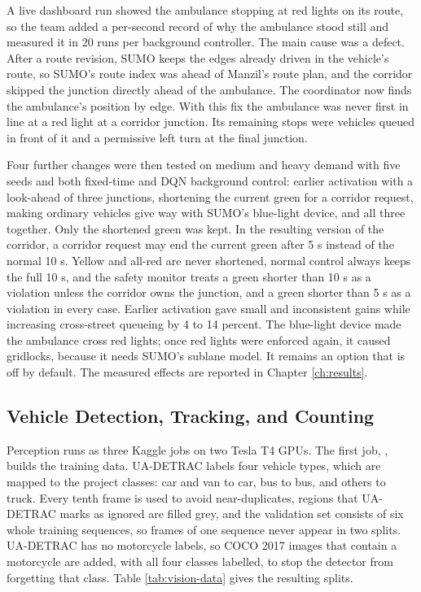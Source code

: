 A live dashboard run showed the ambulance stopping at red lights on its route, so the team added a per-second record of why the ambulance stood still and measured it in 20 runs per background controller. The main cause was a defect. After a route revision, SUMO keeps the edges already driven in the vehicle's route, so SUMO's route index was ahead of Manzil's route plan, and the corridor skipped the junction directly ahead of the ambulance. The coordinator now finds the ambulance's position by edge. With this fix the ambulance was never first in line at a red light at a corridor junction. Its remaining stops were vehicles queued in front of it and a permissive left turn at the final junction.

Four further changes were then tested on medium and heavy demand with five seeds and both fixed-time and DQN background control: earlier activation with a look-ahead of three junctions, shortening the current green for a corridor request, making ordinary vehicles give way with SUMO's blue-light device, and all three together. Only the shortened green was kept. In the resulting version of the corridor, a corridor request may end the current green after 5 s instead of the normal 10 s. Yellow and all-red are never shortened, normal control always keeps the full 10 s, and the safety monitor treats a green shorter than 10 s as a violation unless the corridor owns the junction, and a green shorter than 5 s as a violation in every case. Earlier activation gave small and inconsistent gains while increasing cross-street queueing by 4 to 14 percent. The blue-light device made the ambulance cross red lights; once red lights were enforced again, it caused gridlocks, because it needs SUMO's sublane model. It remains an option that is off by default. The measured effects are reported in Chapter \ref{ch:results}.

\subsection{Vehicle Detection, Tracking, and Counting}

Perception runs as three Kaggle jobs on two Tesla T4 GPUs. The first job, , builds the training data. UA-DETRAC labels four vehicle types, which are mapped to the project classes: car and van to car, bus to bus, and others to truck. Every tenth frame is used to avoid near-duplicates, regions that UA-DETRAC marks as ignored are filled grey, and the validation set consists of six whole training sequences, so frames of one sequence never appear in two splits. UA-DETRAC has no motorcycle labels, so COCO 2017 \cite{lin2014coco} images that contain a motorcycle are added, with all four classes labelled, to stop the detector from forgetting that class. Table \ref{tab:vision-data} gives the resulting splits.

